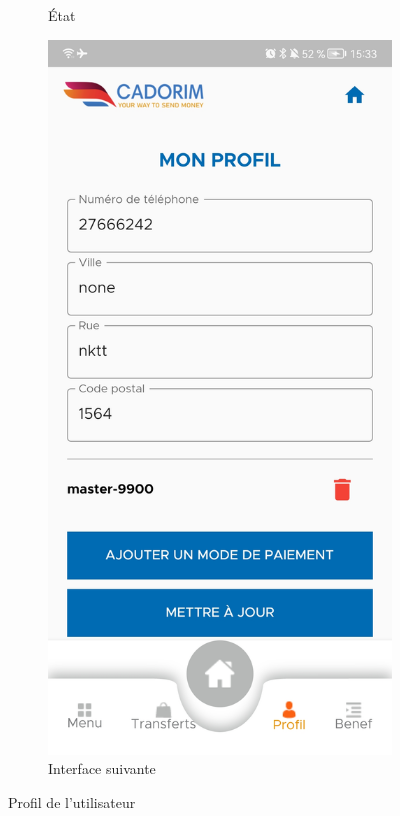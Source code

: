 \begin{itemize}[label=$\ast$]
\begin{figure}
\begin{subfigure}{0.3\textwidth}
	\caption{État}
	\label{fig.SICAPI}
\end{subfigure}
\begin{subfigure}{0.3\textwidth}
	\includegraphics[width=\hsize, valign=m]{./Template LaTeX/Images/10.jpg}
	\caption{Interface suivante}
	\label{fig.painel_sicapi}
\end{subfigure}
	\caption{Profil de l'utilisateur
	}
	\label{fig:three graphs}
\end{figure}



\end{itemize}
